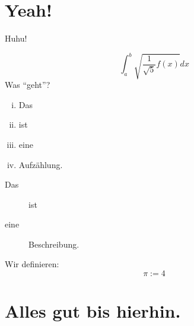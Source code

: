 \section{Yeah!}
Huhu! 

\[
	\int_{a}^{b} \sqrt{\frac{1}{\sqrt{5}} f(x)} dx
\]
Was \enquote{geht}? 

\begin{enumerate}[(i)]
	\item Das
	\item ist 
	\item eine
	\item Aufzählung.
\end{enumerate}

\begin{description}
	\item[Das] ist
	\item[eine] Beschreibung.
\end{description}

\begin{definition}
	Wir definieren:
	\[
		\pi := 4
	\]
\end{definition}

\lipsum

\section{Alles gut bis hierhin.}